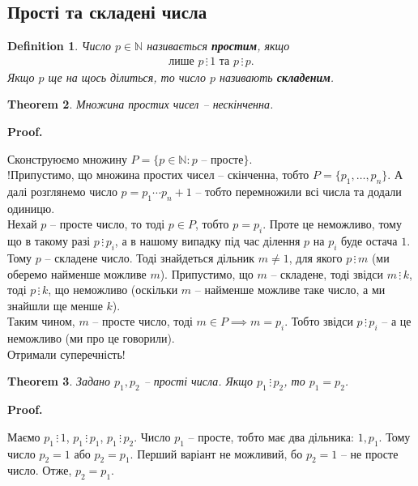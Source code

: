 \documentclass[a4paper, 10pt]{article}
\makeatletter
\def\qed{$\blacksquare$}
\theoremstyle{theoremdd}
\newtheorem{theorem}{Theorem}[subsection]
\theoremstyle{theoremdd}
\newtheorem{definition}[theorem]{Definition}
\theoremstyle{theoremdd}
\theoremstyle{theoremdd}
\theoremstyle{theoremdd}
\theoremstyle{theoremdd}
\theoremstyle{theoremdd}
\theoremstyle{theoremdd}
\renewenvironment{proof}[1][Proof.\\]{\par
\pushQED{\hfill \qed}%
\normalfont \topsep6\p@\@plus6\p@\relax
\trivlist
\item\relax
{\bfseries
#1\@addpunct{.}}\hspace\labelsep\ignorespaces
}{%
\popQED\endtrivlist\@endpefalse
}
\newcommand\divisibleBy{\, \vdots \,}
\makeatother
\begin{document}
\subsection{Прості та складені числа}
\begin{definition}
Число $p \in \mathbb{N}$ називається \textbf{простим}, якщо 
\begin{align*}
\text{лише $p \divisibleBy 1$ та $p \divisibleBy p$}.
\end{align*}
Якщо $p$ ще на щось ділиться, то число $p$ називають \textbf{складеним}.
\end{definition}

\begin{theorem}
Множина простих чисел -- нескінченна.
\end{theorem}

\begin{proof}
Сконструюємо множину $P = \{ p \in \mathbb{N}: p \text{ -- просте} \}$.\\
!Припустимо, що множина простих чисел -- скінченна, тобто $P = \{p_1,\dots,p_n\}$. А далі розглянемо число $p = p_1 \cdots p_n + 1$ -- тобто перемножили всі числа та додали одиницю.\\
Нехай $p$ -- просте число, то тоді $p \in P$, тобто $p = p_i$. Проте це неможливо, тому що в такому разі $p \divisibleBy p_i$, а в нашому випадку під час ділення $p$ на $p_i$ буде остача $1$.\\
Тому $p$ -- складене число. Тоді знайдеться дільник $m \neq 1$, для якого $p \divisibleBy m$ (ми оберемо найменше можливе $m$). Припустимо, що $m$ -- складене, тоді звідси $m \divisibleBy k$, тоді $p \divisibleBy k$, що неможливо (оскільки $m$ -- найменше можливе таке число, а ми знайшли ще менше $k$).\\
Таким чином, $m$ -- просте число, тоді $m \in P \implies m = p_i$. Тобто звідси $p \divisibleBy p_i$ -- а це неможливо (ми про це говорили).\\
Отримали суперечність!
\end{proof}

\begin{theorem}
Задано $p_1,p_2$ -- прості числа. Якщо $p_1 \divisibleBy p_2$, то $p_1 = p_2$.
\end{theorem}

\begin{proof}
Маємо $p_1 \divisibleBy 1$, $p_1 \divisibleBy p_1$, $p_1 \divisibleBy p_2$. Число $p_1$ -- просте, тобто має два дільника: $1,p_1$. Тому число $p_2 = 1$ або $p_2 = p_1$. Перший варіант не можливий, бо $p_2 = 1$ -- не просте число. Отже, $p_2 = p_1$.
\end{proof}
\end{document}
